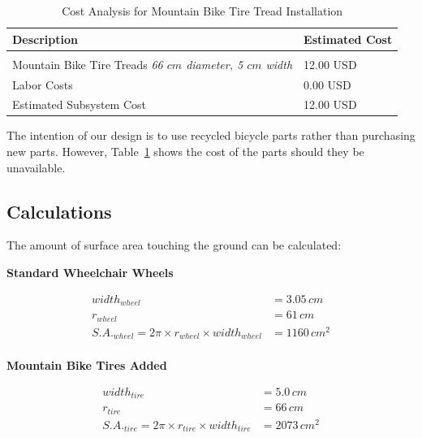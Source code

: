 \documentclass[12pt]{report}
\begin{document}
\begin{table}[H]
    \centering
    \caption{Cost Analysis for Mountain Bike Tire Tread Installation}
    \label{tbl:tire-cost}
    \begin{tabular}{ l l }
        Description & Estimated Cost \\
        \hline \\[-1.2em]
        \parbox{6cm}{Mountain Bike Tire Treads \\ \emph{66 $cm$ diameter, 5
        $cm$ width}} & 12.00 USD\cite{tirecost} \\[0.6em]
        Labor Costs & 0.00 USD\footnotemark[1]\\
        \hline
        Estimated Subsystem Cost & 12.00 USD
    \end{tabular}
\end{table}

The intention of our design is to use recycled bicycle parts rather than
purchasing new parts. However, Table~\ref{tbl:tire-cost} shows the cost of the
parts should they be unavailable.

\subsection{Calculations}

The amount of surface area touching the ground can be calculated:

\textbf{Standard Wheelchair Wheels}
\begin{center}
    \begin{align*}
        width_{wheel} &= 3.05 \, cm \\
        r_{wheel} &= 61 \, cm \\
        {S.A.}_{wheel} = 2\pi \times r_{wheel} \times width_{wheel} &= 1160 \, cm^2 \\
    \end{align*}
\end{center}

\clearpage
\textbf{Mountain Bike Tires Added}
\begin{center}
    \begin{align*}
        width_{tire} &= 5.0 \, cm \\
        r_{tire} &= 66 \, cm \\
        {S.A.}_{tire} = 2\pi \times r_{tire} \times width_{tire} &= 2073 \, cm^2 \\
    \end{align*}
\end{center}
\end{document}
